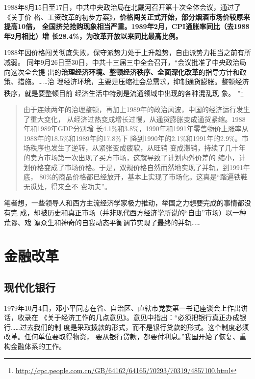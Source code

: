 1988年8月15日至17日，中共中央政治局在北戴河召开第十次全体会议，通过了《关于价
格、工资改革的初步方案》，\textbf{价格闯关正式开始，部分烟酒市场价较原来提高10倍，
  全国挤兑抢购现象相当严重。1989年2月，CPI通胀率同比（去1988年2月相比）增
  长28.4\%，为改革开放以来同比最高比例。}

1988年因价格闯关彻底失败，保守派势力处于上升趋势，自由派势力相当之前有所减弱。
同年9月26日至30日，中共十三届三中全会召开，“会议批准了中央政治局向这次全会提
出的\textbf{治理经济环境、整顿经济秩序、全面深化改革}的指导方针和政策、措施。……治
理经济环境，主要是压缩社会总需求，抑制通货膨胀。整顿经济秩序，就是要整顿目前
经济生活中特别是流通领域中出现的各种混乱现
象。
”\footnote{\url{http://cpc.people.com.cn/GB/64162/64165/70293/70319/4857100.html}}

\begin{quotation}
  由于连续两年的治理整顿，再加上1989年的政治风波，中国的经济运行发生了重大变化，
  从经济过热变成增长过慢，从通货膨胀变成通货紧缩。1988年和1989年GDP分别增
  长4.1\%和3.8\%，1990年和1991年零售物价上涨率从1988年的18.5\%和1989年的17.8\%下
  降到1990年的2.1\%和1991年的2.9\%。市场秩序也发生了逆转，从紧张变成疲软，从旺销
  变成滞销，持续了几十年的卖方市场第一次出现了买方市场，这就导致了计划内外价差的
  缩小，计划价格变成了市场价格。于是，双规价格自然而然地实现了并轨，到1991年底，
  80\%的商品价格都已经放开，基本上实现了市场化。这真是“踏遍铁鞋无觅处，得来全不
  费功夫”。
\end{quotation}

笔者想，一些领导人和西方主流经济学家极力推动，举国之力想要完成的事情都没有完
成，却被历史和真正市场（并非现代西方经济学所说的“自由”市场）以一种荒谬、戏
谑众生和神奇的自我动态平衡调节实现了最终的并轨……


\section{金融改革}
\label{sec:huilv78}

\subsection{现代化银行}

1979年10月4日，邓小平同志在省、自治区、直辖市党委第一书记座谈会上作出讲话，收录在
《关于经济工作的几点意见》。意见中指出：“必须把银行真正办成银行……过去我们的制
度是采取拨款的形式，而不是银行贷款的形式。这个制度必须改革。任何单位要取得物资，
要从银行贷款，都要付利息。”我国开始了恢复、重构金融体系的工作。

